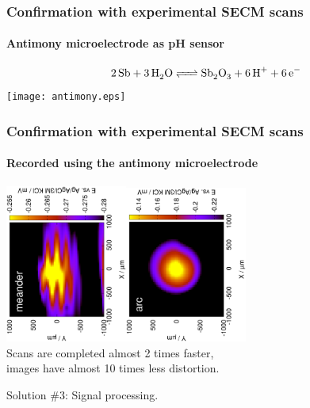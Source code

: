 \documentclass{beamer}
\begin{document}
\begin{frame}
\frametitle{Confirmation with experimental SECM scans}
\framesubtitle{Antimony microelectrode as pH sensor}
\centering
\begin{equation*}
    \ce{2Sb + 3H_2O <=> Sb_2O_3 + 6H^+ + 6e^-}
\end{equation*}
\texttt{[image: antimony.eps]}

\end{frame} 


\begin{frame}
	\centering
	\frametitle{Confirmation with experimental SECM scans}
	\framesubtitle{Recorded using the antimony microelectrode}
	\includegraphics[width=0.3\textwidth, angle=-90]{meander.eps}\includegraphics[width=0.3\textwidth, angle=-90]{arc.eps}\\
	\vfill
	Scans are completed almost 2 times faster,\\ images have almost 10 times less distortion.
\end{frame}

\begin{frame}[plain]
\centering
Solution \#3: Signal processing.
\end{frame}
\end{document}
